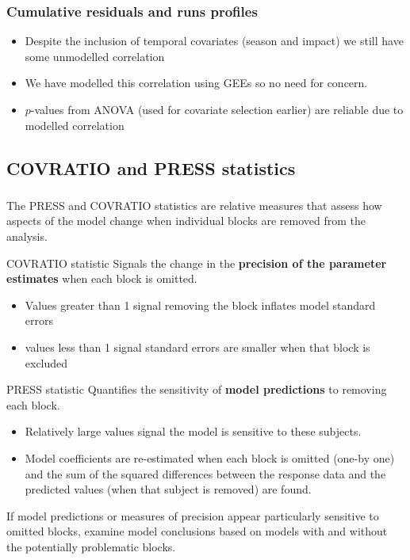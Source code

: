 \begin{frame}
\frametitle{Cumulative residuals and runs profiles}
\begin{itemize}
  \item Despite the inclusion of temporal covariates (season and impact) we still have some unmodelled correlation
  \item We have modelled this correlation using GEEs so no need for concern.
  \item $p$-values from ANOVA (used for covariate selection earlier) are reliable due to modelled correlation
\end{itemize}


\end{frame}

\subsection{COVRATIO and PRESS statistics}

\begin{frame}[fragile]
\frametitle{}

The PRESS and COVRATIO statistics are relative measures that assess how aspects of the model change when individual blocks are removed from the analysis.

\begin{block}{COVRATIO statistic}
Signals the change in the \textbf{precision of the parameter estimates} when each block is omitted. 
\begin{itemize}
\item Values greater than 1 signal removing the block inflates model standard errors 
\item values less than 1 signal standard errors are smaller when that block is excluded 
\end{itemize}
\end{block}

\begin{block}{PRESS statistic}
Quantifies the sensitivity of \textbf{model predictions} to removing each block. 
\begin{itemize}
\item Relatively large values signal the model is sensitive to these subjects.
\item Model coefficients are re-estimated when each block is omitted (one-by one) and the sum of the squared differences between the response data and the predicted values (when that subject is removed) are found.
\end{itemize}
\end{block}

\pause
\bigskip
\noindent If model predictions or measures of precision appear particularly sensitive to omitted blocks, examine model conclusions based on models with and without the potentially problematic blocks.
\end{frame}

